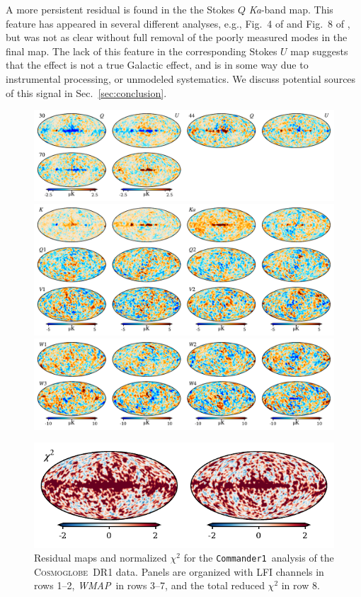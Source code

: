 \documentclass[twocolumn]{../../common/aa}
\def\WMAP{\emph{WMAP}}
\def\commanderone{\texttt{Commander1}}
\newcommand{\red}[0]{\color{red}}
\newcommand{\cosmoglobe}{\textsc{Cosmoglobe}}
\newcommand{\Ka}[0]{\textit{Ka}}
\begin{document}
A more persistent residual is found in the the Stokes $Q$ \Ka-band map. This feature has appeared in several different analyses, e.g., Fig.~4 of \citet{bp14} and Fig.~8 of \citet{weiland:2022}, but was not as clear without full removal of the poorly measured modes in the final map. The lack of this feature in the corresponding Stokes $U$ map suggests that the effect is not a true Galactic effect, and is in some way due to instrumental processing, or unmodeled systematics. We discuss potential sources of this signal in Sec.~\ref{sec:conclusion}.

\begin{figure}
	\begin{center}
	\includegraphics[width=\linewidth]{figures/comm1_res_QU_LFI.pdf}\vspace{-0.3cm}
	\includegraphics[width=\linewidth]{figures/comm1_res_QU_K-V.pdf}\vspace{-0.3cm}
	\includegraphics[width=\linewidth]{figures/comm1_res_QU_W.pdf}\vspace{-0.3cm}
	\end{center}\vspace{-0.3cm}
	\includegraphics[width=0.5\linewidth]{figures/comm1_res_QU_chisq.pdf}
	\caption{Residual maps and normalized $\chi^2$ {\red for the \commanderone\ analysis of the \cosmoglobe\ DR1 data}. Panels are organized with LFI channels in rows 1--2, \WMAP\ in rows 3--7, and the total reduced $\chi^2$ in row 8.}
	\label{fig:res_QU}
\end{figure}
\end{document}
